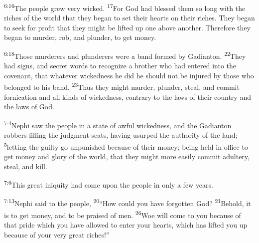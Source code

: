 \documentclass[openany,12pt,english]{book}
\newenvironment{para}{\par\pretolerance=100\tolerance=200\setlength{\emergencystretch}{0.6em}\relax}{\par}
\begin{document}
\begin{para}
    \textsuperscript{6:16}\thinspace{}The peo\-ple grew ver\-y wick\-ed.
    \textsuperscript{17}\thinspace{}For God had bless\-ed them so long with the rich\-es of the world that they be\-gan to set their hearts on their rich\-es. They be\-gan to seek for prof\-it that they might be lifted up one a\-bove an\-oth\-er. There\-fore they be\-gan to mur\-der, rob, and plun\-der, to get mon\-ey.
\end{para}

\begin{para}
    \textsuperscript{6:18}\thinspace{}Those murderers and plunderers were a band formed by Gadianton.
    \textsuperscript{22}\thinspace{}They had signs, and se\-cret words to rec\-og\-nize a broth\-er who had entered in\-to the cov\-e\-nant, that what\-ev\-er wick\-ed\-ness he did he should not be in\-jured by those who belonged to his band.
    \textsuperscript{23}\thinspace{}Thus they might mur\-der, plun\-der, steal, and com\-mit for\-ni\-ca\-tion and all kinds of wick\-ed\-ness, con\-tra\-ry to the laws of their coun\-try and the laws of God.
\end{para}

\bigskip{}

\begin{para}
    \textsuperscript{7:4}\thinspace{}Nephi saw the peo\-ple in a state of aw\-ful wick\-ed\-ness, and the Gadianton robbers fill\-ing the judg\-ment seats, hav\-ing usurped the au\-thor\-i\-ty of the land;
    \textsuperscript{5}\thinspace{}let\-ting the guilt\-y go un\-pun\-ished be\-cause of their mon\-ey; be\-ing held in of\-fice to get mon\-ey and glo\-ry of the world, that they might more eas\-i\-ly com\-mit a\-dul\-ter\-y, steal, and kill.
\end{para}

\begin{para}
    \textsuperscript{7:6}\thinspace{}This great in\-iq\-ui\-ty had come up\-on the peo\-ple in on\-ly a few years.
\end{para}

\begin{para}
    \textsuperscript{7:13}\thinspace{}Nephi said to the peo\-ple,
    \textsuperscript{20}\thinspace{}“How could you have for\-got\-ten God?
    \textsuperscript{21}\thinspace{}Be\-hold, it is to get mon\-ey, and to be praised of men.
    \textsuperscript{26}\thinspace{}Woe will come to you be\-cause of that pride which you have al\-lowed to en\-ter your hearts, which has lifted you up be\-cause of your ver\-y great rich\-es!”
\end{para}
\end{document}
